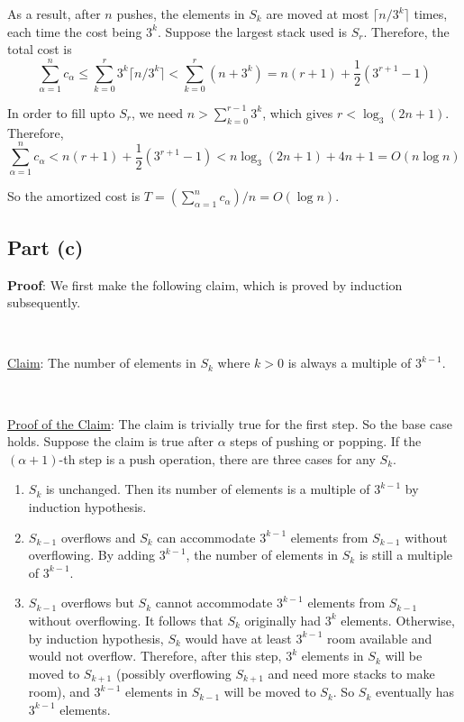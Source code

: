 \documentclass{article}
\begin{document}
As a result, after $n$ pushes, the elements in $S_k$ are moved at most $\lceil n/3^k\rceil$ times, each time the cost being $3^k$. Suppose the largest stack used is $S_r$. Therefore, the total cost is
\begin{equation*}
\sum_{\alpha=1}^nc_\alpha\leqslant\sum_{k=0}^r3^k\lceil n/3^k\rceil<\sum_{k=0}^r(n+3^k)=n(r+1)+\frac{1}{2}(3^{r+1}-1)
\end{equation*}

In order to fill upto $S_r$, we need $n>\sum_{k=0}^{r-1}3^k$, which gives $r<\log_3(2n+1)$. Therefore,
\begin{equation*}
\sum_{\alpha=1}^nc_\alpha<n(r+1)+\frac{1}{2}(3^{r+1}-1)<n\log_3(2n+1)+4n+1=O(n\log n)
\end{equation*}

So the amortized cost is $T=(\sum_{\alpha=1}^nc_\alpha)/n=O(\log n)$.

\subsection{Part (c)}
\noindent\textbf{Proof}:
We first make the following claim, which is proved by induction subsequently.

~

\noindent\underline{Claim}:
The number of elements in $S_k$ where $k>0$ is always a multiple of $3^{k-1}$.

~

\noindent\underline{Proof of the Claim}:
The claim is trivially true for the first step. So the base case holds. Suppose the claim is true after $\alpha$ steps of pushing or popping. If the $(\alpha+1)$-th step is a push operation, there are three cases for any $S_k$.
\begin{enumerate}
\item$S_k$ is unchanged. Then its number of elements is a multiple of $3^{k-1}$ by induction hypothesis.
\item$S_{k-1}$ overflows and $S_k$ can accommodate $3^{k-1}$ elements from $S_{k-1}$ without overflowing. By adding $3^{k-1}$, the number of elements in $S_k$ is still a multiple of $3^{k-1}$.
\item$S_{k-1}$ overflows but $S_k$ cannot accommodate $3^{k-1}$ elements from $S_{k-1}$ without overflowing. It follows that $S_k$ originally had $3^k$ elements. Otherwise, by induction hypothesis, $S_k$ would have at least $3^{k-1}$ room available and would not overflow. Therefore, after this step, $3^k$ elements in $S_k$ will be moved to $S_{k+1}$ (possibly overflowing $S_{k+1}$ and need more stacks to make room), and $3^{k-1}$ elements in $S_{k-1}$ will be moved to $S_k$. So $S_k$ eventually has $3^{k-1}$ elements.
\end{enumerate}
\end{document}
